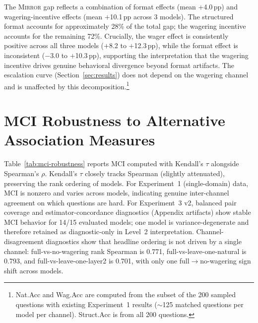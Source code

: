 \documentclass[10pt]{article}
\newcommand{\mirror}{\textsc{Mirror}}
\begin{document}
The \mirror{} gap reflects a combination of format effects (mean $+$4.0\,pp) and wagering-incentive effects (mean $+$10.1\,pp across 3 models). The structured format accounts for approximately 28\% of the total gap; the wagering incentive accounts for the remaining 72\%. Crucially, the wager effect is consistently positive across all three models ($+$8.2 to $+$12.3\,pp), while the format effect is inconsistent ($-$3.0 to $+$10.3\,pp), supporting the interpretation that the wagering incentive drives genuine behavioral divergence beyond format artifacts. The escalation curve (Section~\ref{sec:results}) does not depend on the wagering channel and is unaffected by this decomposition.\footnote{Nat.Acc and Wag.Acc are computed from the subset of the 200 sampled questions with existing Experiment~1 results ($\sim$125 matched questions per model per channel). Struct.Acc is from all 200 questions.}

\section{MCI Robustness to Alternative Association Measures}
\label{app:mci-robust}

Table~\ref{tab:mci-robustness} reports MCI computed with Kendall's $\tau$ alongside Spearman's $\rho$. Kendall's $\tau$ closely tracks Spearman (slightly attenuated), preserving the rank ordering of models. For Experiment~1 (single-domain) data, MCI is nonzero and varies across models, indicating genuine inter-channel agreement on which questions are hard. For Experiment~3 v2, balanced pair coverage and estimator-concordance diagnostics (Appendix artifacts) show stable MCI behavior for 14/15 evaluated models; one model is variance-degenerate and therefore retained as diagnostic-only in Level~2 interpretation. Channel-disagreement diagnostics show that headline ordering is not driven by a single channel: full-vs-no-wagering rank Spearman is 0.771, full-vs-leave-one-natural is 0.793, and full-vs-leave-one-layer2 is 0.701, with only one full$\rightarrow$no-wagering sign shift across models.
\end{document}
